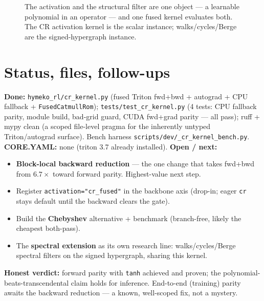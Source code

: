 \documentclass[11pt]{article}
\newcommand{\code}[1]{\texttt{\small #1}}
\begin{document}
\begin{figure}[h]\centering
{}
\caption{The activation and the structural filter are one object --- a learnable polynomial in an operator ---
and one fused kernel evaluates both. The CR activation kernel is the scalar instance; walks/cycles/Berge are
the signed-hypergraph instance.}
\label{fig:spec}
\end{figure}

\section{Status, files, follow-ups}
\textbf{Done:} \code{hymeko\_rl/cr\_kernel.py} (fused Triton fwd+bwd + autograd + CPU fallback +
\code{FusedCatmullRom}); \code{tests/test\_cr\_kernel.py} (4 tests: CPU fallback parity, module build, bad-grid
guard, CUDA fwd+grad parity --- all pass); ruff + mypy clean (a scoped file-level pragma for the inherently
untyped Triton/autograd surface). Bench harness \code{scripts/dev/\_cr\_kernel\_bench.py}. \textbf{CORE.YAML:}
none (triton 3.7 already installed). \textbf{Open / next:}
\begin{itemize}[nosep]
  \item \textbf{Block-local backward reduction} --- the one change that takes fwd+bwd from $6.7\times$ toward
        forward parity. Highest-value next step.
  \item Register \code{activation="cr\_fused"} in the backbone axis (drop-in; eager \code{cr} stays default
        until the backward clears the gate).
  \item Build the \textbf{Chebyshev} alternative + benchmark (branch-free, likely the cheapest both-pass).
  \item The \textbf{spectral extension} as its own research line: walks/cycles/Berge spectral filters on the
        signed hypergraph, sharing this kernel.
\end{itemize}
\textbf{Honest verdict:} forward parity with \code{tanh} achieved and proven; the polynomial-beats-transcendental
claim holds for inference. End-to-end (training) parity awaits the backward reduction --- a known,
well-scoped fix, not a mystery.
\end{document}
